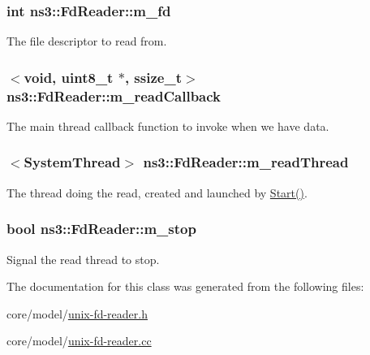 \subsubsection[{\texorpdfstring{m\+\_\+fd}{m_fd}}]{\setlength{\rightskip}{0pt plus 5cm}int ns3\+::\+Fd\+Reader\+::m\+\_\+fd\hspace{0.3cm}{\ttfamily [protected]}}\hypertarget{classns3_1_1FdReader_ad0883be1c0ebac30885c17c0cc17076d}{}\label{classns3_1_1FdReader_ad0883be1c0ebac30885c17c0cc17076d}


The file descriptor to read from. 

\subsubsection[{\texorpdfstring{m\+\_\+read\+Callback}{m_readCallback}}]{$<$void, uint8\+\_\+t $\ast$, ssize\+\_\+t$>$ ns3\+::\+Fd\+Reader\+::m\+\_\+read\+Callback\hspace{0.3cm}{\ttfamily [private]}}\hypertarget{classns3_1_1FdReader_af5cd7136ecc802487df40cd8046d6fe1}{}\label{classns3_1_1FdReader_af5cd7136ecc802487df40cd8046d6fe1}
The main thread callback function to invoke when we have data. 
\subsubsection[{\texorpdfstring{m\+\_\+read\+Thread}{m_readThread}}]{$<${\bf System\+Thread}$>$ ns3\+::\+Fd\+Reader\+::m\+\_\+read\+Thread\hspace{0.3cm}{\ttfamily [private]}}\hypertarget{classns3_1_1FdReader_ae610be5a8e8c8e72620fe131f3277cd6}{}\label{classns3_1_1FdReader_ae610be5a8e8c8e72620fe131f3277cd6}
The thread doing the read, created and launched by \hyperlink{classns3_1_1FdReader_aad8139555df8e9fd58e819f19547a42d}{Start()}. 
\subsubsection[{\texorpdfstring{m\+\_\+stop}{m_stop}}]{\setlength{\rightskip}{0pt plus 5cm}bool ns3\+::\+Fd\+Reader\+::m\+\_\+stop\hspace{0.3cm}{\ttfamily [private]}}\hypertarget{classns3_1_1FdReader_a53bb467852fcfe1a12dd0e32f846b01e}{}\label{classns3_1_1FdReader_a53bb467852fcfe1a12dd0e32f846b01e}
Signal the read thread to stop. 

The documentation for this class was generated from the following files\+:\begin{DoxyCompactItemize}
\item 
core/model/\hyperlink{unix-fd-reader_8h}{unix-\/fd-\/reader.\+h}\item 
core/model/\hyperlink{unix-fd-reader_8cc}{unix-\/fd-\/reader.\+cc}\end{DoxyCompactItemize}
